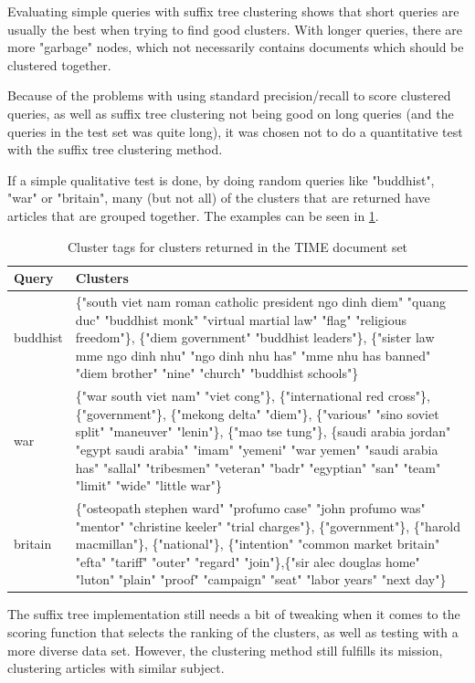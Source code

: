Evaluating simple queries with suffix tree clustering shows that short queries are usually the best when trying to find good clusters. With longer queries, there are more "garbage" nodes, which not necessarily contains documents which should be clustered together.

Because of the problems with using standard precision/recall to score clustered queries, as well as suffix tree clustering not being good on long queries (and the queries in the test set was quite long), it was chosen not to do a quantitative test with the suffix tree clustering method. 

If a simple qualitative test is done, by doing random queries like "buddhist", "war" or "britain", many (but not all) of the clusters that are returned have articles that are grouped together. The examples can be seen in \ref{fig:clusterresults}.

\begin{table}
\begin{tabular}{|l|p{}|}
\hline
Query & Clusters \\
\hline
buddhist & \{"south viet nam roman catholic president ngo dinh diem" "quang duc" "buddhist monk" "virtual martial law" "flag" "religious freedom"\}, \{"diem government" "buddhist leaders"\}, \{"sister law mme ngo dinh nhu" "ngo dinh nhu has" "mme nhu has banned" "diem brother" "nine" "church" "buddhist schools"\}\\ \hline
war & \{"war south viet nam" "viet cong"\}, \{"international red cross"\}, \{"government"\}, \{"mekong delta" "diem"\}, \{"various" "sino soviet split" "maneuver" "lenin"\}, \{"mao tse tung"\}, \{saudi arabia jordan" "egypt saudi arabia" "imam" "yemeni" "war yemen" "saudi arabia has" "sallal" "tribesmen" "veteran" "badr" "egyptian" "san" "team" "limit" "wide" "little war"\}\\ \hline
britain & \{"osteopath stephen ward" "profumo case" "john profumo was" "mentor" "christine keeler" "trial charges"\}, \{"government"\}, \{"harold macmillan"\}, \{"national"\}, \{"intention" "common market britain" "efta" "tariff" "outer" "regard" "join"\},\{"sir alec douglas home" "luton" "plain" "proof" "campaign" "seat" "labor years" "next day"\} \\ \hline

\end{tabular}
\caption{Cluster tags for clusters returned in the TIME document set}\label{fig:clusterresults}
\end{table}


The suffix tree implementation still needs a bit of tweaking when it comes to the scoring function that selects the ranking of the clusters, as well as testing with a more diverse data set. However, the clustering method still fulfills its mission, clustering articles with similar subject.